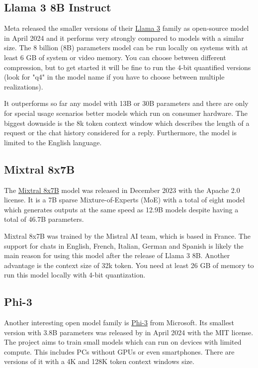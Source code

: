 \documentclass[parskip=half]{scrreprt} %
\begin{document}
\subsection{Llama 3 8B Instruct}
Meta released the smaller versions of their \href{https://llama.meta.com/llama3/}{Llama 3} family as open-source model in April 2024 and it performs very strongly compared to models with a similar size.
The 8 billion (8B) parameters model can be run locally on systems with at least 6 GB of system or video memory.
You can choose between different compression, but to get started it will be fine to run the 4-bit quantified versions (look for "q4" in the model name if you have to choose between multiple realizations).

It outperforms so far any model with 13B or 30B parameters and there are only for special usage scenarios better models which run on consumer hardware.
The biggest downside is the 8k token context window which describes the length of a request or the chat history considered for a reply. Furthermore, the model is limited to the English language.

\subsection{Mixtral 8x7B}
The \href{https://mistral.ai/news/mixtral-of-experts/}{Mixtral 8x7B} model was released in December 2023 with the Apache 2.0 license.
It is a 7B sparse Mixture-of-Experts (MoE) with a total of eight model which generates outputs at the same speed as 12.9B models despite having a total of 46.7B parameters.

Mixtral 8x7B was trained by the Mistral AI team, which is based in France.
The support for chats in English, French, Italian, German and Spanish is likely the main reason for using this model after the release of Llama 3 8B.
Another advantage is the context size of 32k token.
You need at least 26 GB of memory to run this model locally with 4-bit quantization.

\subsection{Phi-3}
Another interesting open model family is \href{https://news.microsoft.com/source/features/ai/the-phi-3-small-language-models-with-big-potential/}{Phi-3} from Microsoft.
Its smallest version with 3.8B parameters was released by in April 2024 with the MIT license.
The project aims to train small models which can run on devices with limited compute.
This includes PCs without GPUs or even smartphones. There are versions of it with a 4K and 128K token context windows size.
\end{document}
